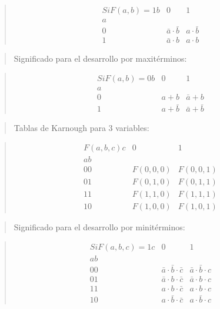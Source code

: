 \begin{quote}
\[\begin{matrix}
{\mathit{Si}F{{({a,b})} = 1}b} & 0 & 1 \\
a & & \\
0 & {\bar{a} \cdot \bar{b}} & {a \cdot \bar{b}} \\
1 & {\bar{a} \cdot b} & {a \cdot b}
\end{matrix}\]
\end{quote}

\begin{quote}
Significado para el desarrollo por maxitérminos:
\end{quote}

\begin{quote}
\[\begin{matrix}
{\mathit{Si}F{{({a,b})} = 0}b} & 0 & 1 \\
a & & \\
0 & {a + b} & {\bar{a} + b} \\
1 & {a + \bar{b}} & {\bar{a} + \bar{b}}
\end{matrix}\]
\end{quote}

\begin{quote}
Tablas de Karnough para 3 variables:
\end{quote}

\begin{quote}
\[\begin{matrix}
{F{({a,b,c})}c} & 0 & 1 \\
\mathit{ab} & & \\
00 & {F{({0,0,0})}} & {F{({0,0,1})}} \\
01 & {F{({0,1,0})}} & {F{({0,1,1})}} \\
11 & {F{({1,1,0})}} & {F{({1,1,1})}} \\
10 & {F{({1,0,0})}} & {F{({1,0,1})}}
\end{matrix}\]
\end{quote}

\begin{quote}
Significado para el desarrollo por minitérminos:
\end{quote}

\begin{quote}
\[\begin{matrix}
{\mathit{Si}F{{({a,b,c})} = 1}c} & 0 & 1 \\
\mathit{ab} & & \\
00 & {{\bar{a} \cdot \bar{b}} \cdot \bar{c}} & {{\bar{a} \cdot \bar{b}} \cdot c} \\
01 & {{\bar{a} \cdot b} \cdot \bar{c}} & {{\bar{a} \cdot b} \cdot c} \\
11 & {{a \cdot b} \cdot \bar{c}} & {{a \cdot b} \cdot c} \\
10 & {{a \cdot \bar{b}} \cdot \bar{c}} & {{a \cdot \bar{b}} \cdot c}
\end{matrix}\]
\end{quote}

